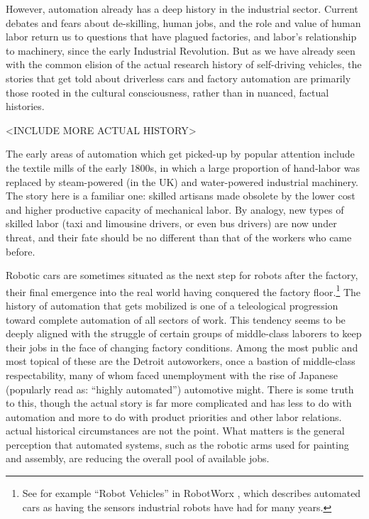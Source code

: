 However, automation already has a deep
history in the industrial sector. Current debates and fears about de-skilling, human jobs,
and the role and value of human labor return us to questions that have
plagued factories, and labor's relationship to machinery, since the
early Industrial Revolution. But as we have already seen with the common
elision of the actual research history of self-driving vehicles, the
stories that get told about driverless cars and factory automation are
primarily those rooted in the cultural consciousness, rather than in
nuanced, factual histories.

<INCLUDE MORE ACTUAL HISTORY>

The early areas of automation which get picked-up by popular attention
include the textile mills of the early 1800s, in which a large
proportion of hand-labor was replaced by steam-powered (in the UK) and
water-powered industrial machinery.\cite{???-fromMRSmithClass} The
story here is a familiar one: skilled artisans made obsolete by the
lower cost and higher productive capacity of mechanical labor. By
analogy, new types of skilled labor (taxi and limousine drivers, or
even bus drivers) are now under threat, and their fate should be no
different than that of the workers who came before.

Robotic cars are sometimes situated as
the next step for robots after the factory, their final emergence into
the real world having conquered the factory floor.\footnote{See for
  example ``Robot Vehicles'' in RobotWorx \cite{robotworx}, which describes automated cars as having the sensors
  industrial robots have had for many years.} The history of
automation that gets mobilized is one of a teleological progression
toward complete automation of all sectors of work. This tendency seems
to be deeply aligned with the struggle of certain groups of
middle-class laborers to keep their jobs in the face of changing
factory conditions. Among the most public and most topical of these
are the Detroit autoworkers, once a bastion of middle-class
respectability, many of whom faced unemployment with the rise of
Japanese (popularly read as: ``highly automated'') automotive
might.\cite{???} There is some truth to this, though the actual story
is far more complicated and has less to do with automation and more to
do with product priorities and other labor
relations.\cite{???-nyeAmericas} actual historical circumstances are
not the point. What matters is the general perception that automated
systems, such as the robotic arms used for painting and assembly, are
reducing the overall pool of available jobs.

